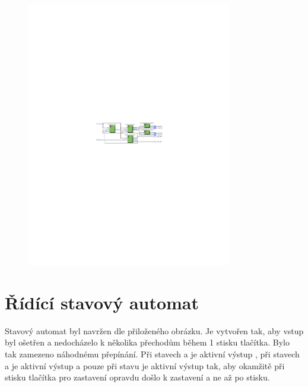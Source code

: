 \documentclass[FM,ZP]{tulthesis}
\begin{document}
	\begin{figure}[h]
		\centering
		\includegraphics[clip,width=0.8\textwidth]{stopwatch.pdf}
	\end{figure}
	
	\section{Řídící stavový automat}
	Stavový automat byl navržen dle přiloženého obrázku. Je vytvořen tak, aby vstup byl ošetřen a nedocházelo k několika přechodům během 1 stisku tlačítka. Bylo tak zamezeno náhodnému přepínání. Při stavech  a  je aktivní výstup , při stavech  a  je aktivní výstup  a pouze při stavu  je aktivní výstup  tak, aby okamžitě při stisku tlačítka pro zastavení opravdu došlo k zastavení a ne až po stisku.
\end{document}
